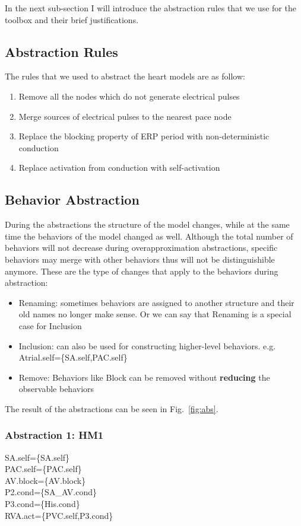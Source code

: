 \documentclass{llncs}
\newcommand{\figref}[1]{Fig.~\ref{fig:#1}}
\newcommand{\Hao}[1]{$\clubsuit$\footnote{HAO: #1}}
\begin{document}
In the next sub-section I will introduce the abstraction rules that we use for the toolbox and their brief justifications.

\subsection{Abstraction Rules}
The rules that we used to abstract the heart models are as follow:
\begin{enumerate}
	\item Remove all the nodes which do not generate electrical pulses
    \item Merge sources of electrical pulses to the nearest pace node
    \item Replace the blocking property of ERP period with non-deterministic conduction
    \item Replace activation from conduction with self-activation
\end{enumerate}

\subsection{Behavior Abstraction}
During the abstractions the structure of the model changes, while at the same time the behaviors of the model changed as well. Although the total number of behaviors will not decrease during overapproximation abstractions, specific behaviors may merge with other behaviors thus will not be distinguishible anymore. These are the type of changes that apply to the behaviors during abstraction:
\begin{itemize}
	\item Renaming: sometimes behaviors are assigned to another structure and their old names no longer make sense. Or we can say that Renaming is a special case for Inclusion
    \item Inclusion: can also be used for constructing higher-level behaviors. e.g. \textsf{Atrial.self=\{SA.self,PAC.self\}}
    \item Remove: Behaviors like Block can be removed without \textbf{reducing} the observable behaviors
\end{itemize}
The result of the abstractions can be seen in \figref{abs}. 
\subsubsection{Abstraction 1: HM1}
\textsf{SA.self=\{SA.self\}\\
PAC.self=\{PAC.self\}\\
AV.block=\{AV.block\}\\
P2.cond=\{SA\_AV.cond\}\\
P3.cond=\{His.cond\}\\ 
RVA.act=\{PVC.self,P3.cond\}}
\end{document}
